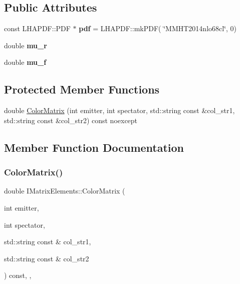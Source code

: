 \subsection*{Public Attributes}
\begin{DoxyCompactItemize}
\item 
\mbox{\label{classIMatrixElements_a879e9c7a503d4a45f6350895b95dac7f}} 
const L\+H\+A\+P\+D\+F\+::\+P\+DF $\ast$ {\bfseries pdf} = L\+H\+A\+P\+D\+F\+::mk\+P\+DF( \char`\"{}M\+M\+H\+T2014nlo68cl\char`\"{}, 0)
\item 
\mbox{\label{classIMatrixElements_a4de973226329ef05c481985034a1948b}} 
double {\bfseries mu\+\_\+r}
\item 
\mbox{\label{classIMatrixElements_adc0990934962a27a52eb5d9777a7c001}} 
double {\bfseries mu\+\_\+f}
\end{DoxyCompactItemize}
\subsection*{Protected Member Functions}
\begin{DoxyCompactItemize}
\item 
double \hyperlink{classIMatrixElements_a52d63344564298f762f576b011ee8889}{Color\+Matrix} (int emitter, int spectator, std\+::string const \&col\+\_\+str1, std\+::string const \&col\+\_\+str2) const noexcept
\end{DoxyCompactItemize}


\subsection{Member Function Documentation}
\mbox{\label{classIMatrixElements_a52d63344564298f762f576b011ee8889}} 
\subsubsection{\texorpdfstring{Color\+Matrix()}{ColorMatrix()}}
{\footnotesize\ttfamily double I\+Matrix\+Elements\+::\+Color\+Matrix (\begin{DoxyParamCaption}\item[{int}]{emitter,  }\item[{int}]{spectator,  }\item[{std\+::string const \&}]{col\+\_\+str1,  }\item[{std\+::string const \&}]{col\+\_\+str2 }\end{DoxyParamCaption}) const\hspace{0.3cm}{\ttfamily [inline]}, {\ttfamily [protected]}, {\ttfamily [noexcept]}}


